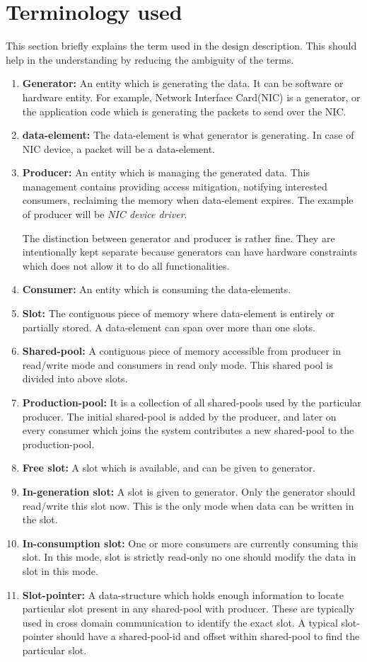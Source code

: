 \documentclass[a4paper,twoside]{report} %
\begin{document}
\section{Terminology used}
This section briefly explains the term used in the design 
description.  This should help in the understanding by reducing 
the ambiguity of the terms.
\begin{enumerate}
  \item \textbf{Generator:} An entity which is generating the data.  It
  can be software or hardware entity.  For example, Network
  Interface Card(NIC) is a generator, or the application code
  which is generating the packets to send over the NIC.
  \item \textbf{data-element:} The data-element is what generator 
  is generating. In case of NIC device, a packet will be a
  data-element.
  \item \textbf{Producer:} An entity which is managing the generated data.
  This management contains providing access mitigation, notifying
  interested consumers, reclaiming the memory when data-element
  expires.  The example of producer will be \textit{NIC device
  driver}.  


  The distinction between generator and producer is
  rather fine.  They are intentionally kept separate because
  generators can have hardware constraints which does not allow
  it to do all functionalities.
  \item \textbf{Consumer:} An entity which is consuming the data-elements. 
  \item \textbf{Slot:} The contiguous piece of memory where data-element is
  entirely or partially stored. A data-element can span over
  more than one slots. 
  \item \textbf{Shared-pool:} A contiguous piece of memory accessible 
   from producer in read/write mode and consumers in read only mode.
   This shared pool is divided into above slots.
  \item \textbf{Production-pool:} It is a collection of all
  shared-pools used by the particular producer.  The initial
  shared-pool is added by the producer, and later on every consumer
  which joins the system contributes a new shared-pool to the
  production-pool.
  \item \textbf{Free slot:} A slot which is available, and can be given
  to generator.
  \item \textbf{In-generation slot:} A slot is given to generator. Only 
  the generator should read/write this slot now.  This is the only
  mode when data can be written in the slot.
  \item \textbf{In-consumption slot:} One or more consumers are currently
  consuming this slot.  In this mode, slot is strictly read-only
  no one should modify the data in slot in this mode.
  \item \textbf{Slot-pointer:} A data-structure which holds enough
  information to locate particular slot present in any shared-pool
  with producer.  These are typically used in cross domain
  communication to identify the exact slot.  A typical slot-pointer
  should have a shared-pool-id and offset within shared-pool to
  find the particular slot.
\end{enumerate}
\end{document}
